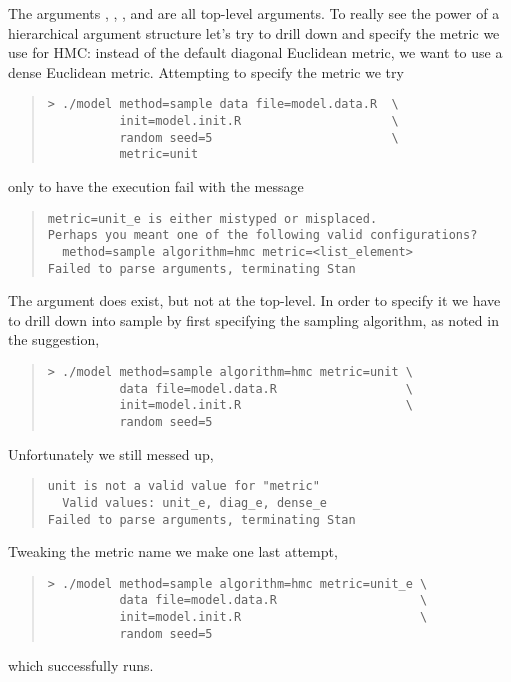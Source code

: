 The arguments , , , and
 are all top-level arguments.  To really see the power of
a hierarchical argument structure let's try to drill down and specify
the metric we use for HMC: instead of the default diagonal Euclidean
metric, we want to use a dense Euclidean metric.  Attempting to
specify the metric we try
%
\begin{quote}
\begin{Verbatim}[fontshape=sl]
> ./model method=sample data file=model.data.R  \
          init=model.init.R                     \
          random seed=5                         \
          metric=unit
\end{Verbatim}
\end{quote}
%
only to have the execution fail with the message
%
\begin{quote}
\begin{Verbatim}
metric=unit_e is either mistyped or misplaced.
Perhaps you meant one of the following valid configurations?
  method=sample algorithm=hmc metric=<list_element>
Failed to parse arguments, terminating Stan
\end{Verbatim}
\end{quote}
%
The argument  does exist, but not at the top-level.  In order
to specify it we have to drill down into sample by first specifying the
sampling algorithm, as noted in the suggestion,
%
\begin{quote}
\begin{Verbatim}[fontshape=sl]
> ./model method=sample algorithm=hmc metric=unit \
          data file=model.data.R                  \
          init=model.init.R                       \
          random seed=5
\end{Verbatim}
\end{quote}
%
Unfortunately we still messed up,
%
\begin{quote}
\begin{Verbatim}
unit is not a valid value for "metric"
  Valid values: unit_e, diag_e, dense_e
Failed to parse arguments, terminating Stan
\end{Verbatim}
\end{quote}
%
Tweaking the metric name we make one last attempt,
%
\begin{quote}
\begin{Verbatim}[fontshape=sl]
> ./model method=sample algorithm=hmc metric=unit_e \
          data file=model.data.R                    \
          init=model.init.R                         \
          random seed=5
\end{Verbatim}
\end{quote}
%
which successfully runs.

